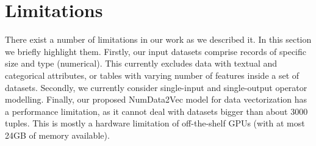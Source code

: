 
\section{Limitations}
There exist a number of limitations in our work as we described it. In this section we briefly highlight them.
Firstly, our input datasets comprise records of specific size and type (numerical). This currently excludes data with textual and categorical attributes, or tables with varying number of features inside a set of datasets.
Secondly, we currently consider single-input and single-output operator modelling. 
Finally, our proposed NumData2Vec model for data vectorization has a performance limitation, as it cannot deal with datasets bigger than about $3000$ tuples. This is mostly a hardware limitation of off-the-shelf GPUs (with at most 24GB of memory available).